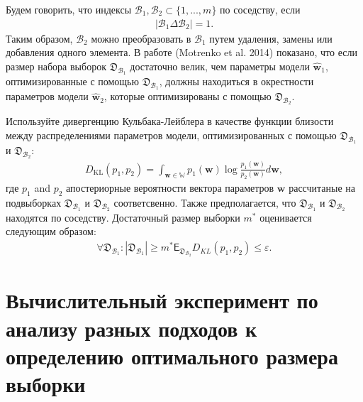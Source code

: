 Будем говорить, что индексы $\mathcal{B}_1,\mathcal{B}_2 \subset \{1,...,m\}$ по соседству, если
\[
\label{eq:bs:8}
\begin{aligned}
	\left|\mathcal{B}_1 \Delta \mathcal{B}_2\right| = 1.
\end{aligned}
\]
Таким образом, $\mathcal{B}_2 $ можно преобразовать в $\mathcal{B}_1$ путем удаления, замены или добавления одного элемента. В работе (Motrenko et al. 2014) показано, что если размер набора выборок $\mathfrak {D}_{\mathcal {B}_1}$ достаточно велик, чем параметры модели $\hat{\textbf {w}}_1$, оптимизированные с помощью $\mathfrak{D}_{\mathcal{B}_1}$, должны находиться в окрестности параметров модели $\hat{\textbf{w}}_2 $, которые оптимизированы с помощью $\mathfrak{D}_{\mathcal {B}_2}$.
	 
Используйте дивергенцию Кульбака-Лейблера в качестве функции близости между распределениями параметров модели, оптимизированных с помощью $\mathfrak{D}_{\mathcal{B}_1}$ и $\mathfrak{D}_{\mathcal{B}_2}$:
\[
\label{eq:bs:9}
\begin{aligned}
	D_\text{KL}\left(p_1, p_2\right) = \int_{\textbf{w}\in\mathbb{W}}p_1(\textbf{w})\log\frac{p_1(\textbf{w})}{p_2(\textbf{w})}d\textbf{w},
\end{aligned}
\]
где $p_1$ and $p_2$ апостериорные вероятности вектора параметров $\textbf{w}$ рассчитаные на подвыборках $\mathfrak{D}_{\mathcal{B}_1}$ и $\mathfrak{D}_{\mathcal{B}_2}$ соответсвенно. Также предполагается, что $\mathfrak{D}_{\mathcal{B}_1}$ и $\mathfrak{D}_{\mathcal{B}_2}$ находятся по соседству.
Достаточный размер выборки $m^*$ оценивается следующим образом:
\[
\label{eq:bs:10}
\begin{aligned}
	\forall \mathfrak{D}_{\mathcal{B}_1}: \left|\mathfrak{D}_{\mathcal{B}_1}\right| \geq m^*    \mathsf{E}_{\mathfrak{D}_{\mathcal{B}_2}}D_{KL}\left(p_1, p_2\right) \leq \varepsilon.
\end{aligned}
\]

	  
\section{Вычислительный эксперимент по анализу разных подходов к определению оптимального размера выборки}
\begin{table}[!htp]
\centering
\caption{Описание выборок для эксперимента}
\label{table20}
\end{table} 


